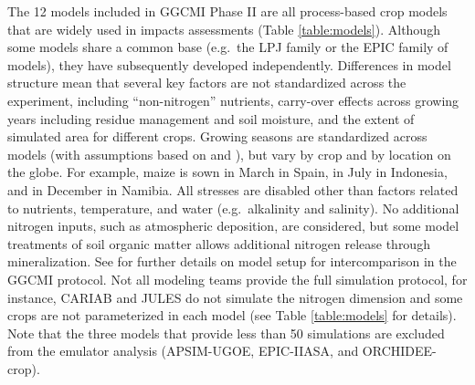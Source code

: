 \documentclass[gmd, manuscript]{copernicus} %
\begin{document}
The 12 models included in GGCMI Phase II are all process-based crop models that are widely used in impacts assessments (Table \ref{table:models}). Although some models share a common base (e.g.\ the LPJ family or the EPIC family of models), they have subsequently developed independently. Differences in model structure mean that several key factors are not standardized across the experiment, including ``non-nitrogen'' nutrients, carry-over effects across growing years including residue management and soil moisture, and the extent of simulated area for different crops. Growing seasons are standardized across models (with assumptions based on \citet{Sacks2010} and \citet{Portmann2008, Portmann2010}), but vary by crop and by location on the globe. For example, maize is sown in March in Spain, in July in Indonesia, and in December in Namibia. All stresses are disabled other than factors related to nutrients, temperature, and water (e.g.\ alkalinity and salinity). No additional nitrogen inputs, such as atmospheric deposition, are considered, but some model treatments of soil organic matter allows additional nitrogen release through mineralization. See \citet{Elliott2015} for further details on model setup for intercomparison in the GGCMI protocol. Not all modeling teams provide the full simulation protocol, for instance, CARIAB and JULES do not simulate the nitrogen dimension and some crops are not parameterized in each model (see Table \ref{table:models} for details). Note that the three models that provide less than 50 simulations are excluded from the emulator analysis (APSIM-UGOE, EPIC-IIASA, and ORCHIDEE-crop).


\end{document}
